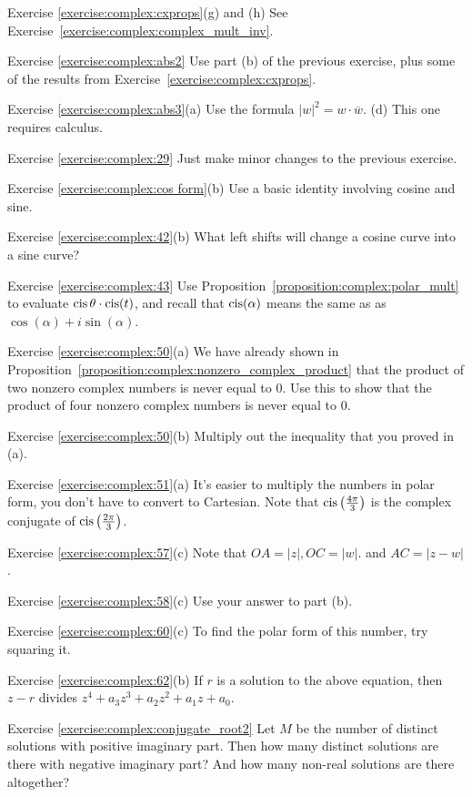 \noindent Exercise \ref{exercise:complex:cxprops}(g) and (h)
See Exercise~\ref{exercise:complex:complex_mult_inv}.


\noindent Exercise \ref{exercise:complex:abs2}
Use part (b) of the previous exercise, plus
some of the results from Exercise~\ref{exercise:complex:cxprops}.


\noindent Exercise \ref{exercise:complex:abs3}(a)
Use the formula $|w|^2 = w\cdot \overline{w}$.  (d) This one requires calculus.

\noindent Exercise \ref{exercise:complex:29}
Just make minor changes to the previous exercise.

\noindent Exercise \ref{exercise:complex:cos form}(b)
Use a basic identity involving cosine and sine.

\noindent Exercise \ref{exercise:complex:42}(b)
What left shifts will change a cosine curve into a sine curve?

\noindent Exercise \ref{exercise:complex:43}
 Use Proposition~\ref{proposition:complex:polar_mult} to evaluate $\operatorname{cis}\theta \cdot \operatorname{cis}( t)$, and recall that $\operatorname{cis}(\alpha)$ means the same as as $\cos(\alpha) + i \sin(\alpha)$.


\noindent Exercise \ref{exercise:complex:50}(a)
We have already shown  in Proposition~\ref{proposition:complex:nonzero_complex_product} that the product of two nonzero complex numbers is never equal to 0. Use this to show that the product of four nonzero complex numbers is never equal to 0.


\noindent Exercise \ref{exercise:complex:50}(b)
Multiply out the inequality that you proved in (a).

\noindent Exercise \ref{exercise:complex:51}(a)
It's easier to multiply the numbers in polar form, you don't have to convert to Cartesian.  Note that $\operatorname{cis}\left(\frac{4\pi}{3}\right)$ is the complex conjugate of $\operatorname{cis}\left(\frac{2\pi}{3}\right)$.


\noindent Exercise \ref{exercise:complex:57}(c)
Note that $OA = |z|, OC = |w|.$ and $AC = |z-w|$.

\noindent Exercise \ref{exercise:complex:58}(c)
Use your answer to part (b).

\noindent Exercise \ref{exercise:complex:60}(c)
 To find the polar form of this number, try squaring it.

\noindent Exercise \ref{exercise:complex:62}(b)
If $r$ is a solution to the above equation, then $z-r$ divides  $z^4 + a_{3}z^{3} + a_{2} z^{2}+ a_1 z  + a_0$.

\noindent Exercise \ref{exercise:complex:conjugate_root2}
 Let $M$ be the number of distinct solutions with positive imaginary part. Then how many distinct solutions are there with negative imaginary part? And how many non-real solutions are there altogether?

